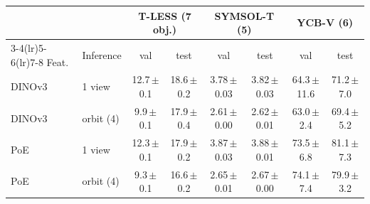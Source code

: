 \begin{tabular}{@{}ll cc cc cc@{}}
\toprule
 & & \multicolumn{2}{c}{T-LESS (7 obj.)} & \multicolumn{2}{c}{SYMSOL-T (5)} & \multicolumn{2}{c}{YCB-V (6)} \\
\cmidrule(lr){3-4}\cmidrule(lr){5-6}\cmidrule(lr){7-8} Feat. & Inference & val & test & val & test & val & test \\
\midrule
DINOv3 & 1 view & 12.7\,{\scriptsize$\pm$0.1} & 18.6\,{\scriptsize$\pm$0.2} & 3.78\,{\scriptsize$\pm$0.03} & 3.82\,{\scriptsize$\pm$0.03} & 64.3\,{\scriptsize$\pm$11.6} & 71.2\,{\scriptsize$\pm$7.0} \\
DINOv3 & orbit (4) & 9.9\,{\scriptsize$\pm$0.1} & 17.9\,{\scriptsize$\pm$0.4} & 2.61\,{\scriptsize$\pm$0.00} & 2.62\,{\scriptsize$\pm$0.01} & 63.0\,{\scriptsize$\pm$2.4} & 69.4\,{\scriptsize$\pm$5.2} \\
PoE & 1 view & 12.3\,{\scriptsize$\pm$0.1} & 17.9\,{\scriptsize$\pm$0.2} & 3.87\,{\scriptsize$\pm$0.03} & 3.88\,{\scriptsize$\pm$0.01} & 73.5\,{\scriptsize$\pm$6.8} & 81.1\,{\scriptsize$\pm$7.3} \\
PoE & orbit (4) & 9.3\,{\scriptsize$\pm$0.1} & 16.6\,{\scriptsize$\pm$0.2} & 2.65\,{\scriptsize$\pm$0.01} & 2.67\,{\scriptsize$\pm$0.00} & 74.1\,{\scriptsize$\pm$7.4} & 79.9\,{\scriptsize$\pm$3.2} \\
\bottomrule
\end{tabular}